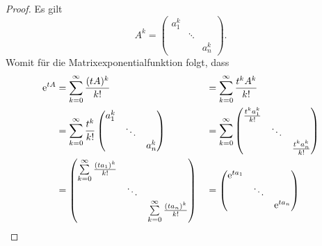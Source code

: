 \begin{proof}
    Es gilt
    \begin{equation*}
        A^k = \begin{pmatrix}
                  a^k_1 &        & \\
                  & \ddots & \\
                  &        & a^k_n
        \end{pmatrix}.
    \end{equation*}
    Womit für die Matrixexponentialfunktion folgt, dass
    \begin{alignat*}{2}
        \mathrm{e}^{t A}
        &= \sum^\infty_{k=0} \frac{(tA)^k}{k!}
            &&= \sum^\infty_{k=0} \frac{t^k A^k}{k!}\\
        &= \sum^\infty_{k=0} \frac{t^k}{k!}
                \begin{pmatrix}
                    a^k_1 &        & \\
                          & \ddots & \\
                          &        & a^k_n
                \end{pmatrix}
            &&= \sum^\infty_{k=0}
                \begin{pmatrix}
                    \frac{t^k a^k_1}{k!} &        & \\
                                         & \ddots & \\
                                         &        & \frac{t^k a^k_n}{k!}
                \end{pmatrix}\\
        &= \begin{pmatrix}
                    \sum\limits^\infty_{k=0} \frac{(t a_1)^k}{k!} &        & \\
                                                                 & \ddots & \\
                                                                 &        & \sum\limits^\infty_{k=0} \frac{(t a_n)^k}{k!}
                \end{pmatrix}
            &&= \begin{pmatrix}
                   \mathrm{e}^{t a_1} &        & \\
                              & \ddots & \\
                              &        & \mathrm{e}^{t a_n}
            \end{pmatrix}
    \end{alignat*}
\end{proof}



